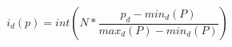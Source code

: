\begin{equation}
i_{d}(p) = int\left(N * \frac{p_{d} - min_{d}(P)}{max_{d}(P) - min_{d}(P)}\right)
\end{equation}
